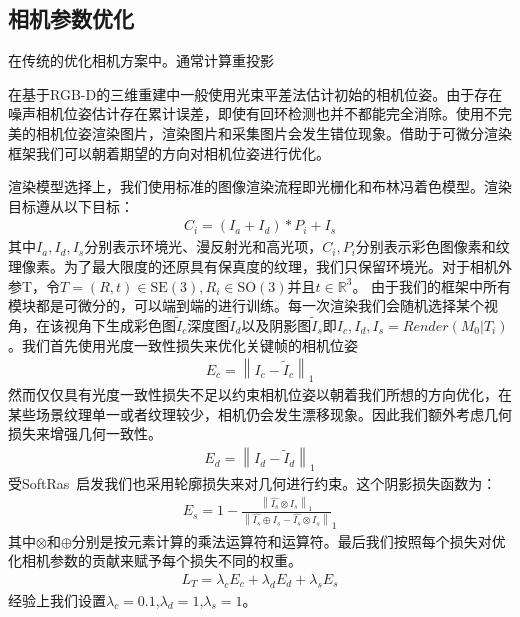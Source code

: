 \subsection{相机参数优化}
在传统的优化相机方案中。通常计算重投影

在基于RGB-D的三维重建中一般使用光束平差法估计初始的相机位姿。由于存在噪声相机位姿估计存在累计误差，即使有回环检测也并不都能完全消除。使用不完美的相机位姿渲染图片，渲染图片和采集图片会发生错位现象。借助于可微分渲染框架我们可以朝着期望的方向对相机位姿进行优化。\par
渲染模型选择上，我们使用标准的图像渲染流程即光栅化和布林冯着色模型。渲染目标遵从以下目标：
\begin{align}
	C_i = (I_a + I_d) * P_i + I_s
\end{align}
其中$I_a,I_d,I_s$分别表示环境光、漫反射光和高光项，$C_i,P_i$分别表示彩色图像素和纹理像素。为了最大限度的还原具有保真度的纹理，我们只保留环境光。对于相机外参T，令$T = (R,t)\in \mathrm{SE} (3),R_i \in \mathrm{SO}(3)$并且$t\in\mathbb{R}^3$。 
由于我们的框架中所有模块都是可微分的，可以端到端的进行训练。每一次渲染我们会随机选择某个视角，在该视角下生成彩色图$\tilde{I}_c$深度图$\tilde{I}_d$以及阴影图$\tilde{I}_s$即$I_c,I_d,I_s = Render(M_0|T_i)$。我们首先使用光度一致性损失来优化关键帧的相机位姿
\begin{align}
	E_c = \left \| I_c - \tilde{I}_c  \right \|_1 
\end{align}
然而仅仅具有光度一致性损失不足以约束相机位姿以朝着我们所想的方向优化，在某些场景纹理单一或者纹理较少，相机仍会发生漂移现象。因此我们额外考虑几何损失来增强几何一致性。
\begin{align}
	E_d = \left \| I_d - \tilde{I}_d  \right \|_1 
\end{align}
受SoftRas~\cite{ShichenLiu2019SoftRA}启发我们也采用轮廓损失来对几何进行约束。这个阴影损失函数为：
\begin{align}
	E_s = 1 - \frac{\left \| \hat{I_s}\otimes I_s  \right \|_1 }{\left \| \hat{I_s}\oplus  I_s- \hat{I_s}\otimes I_s \right \| }_1  
\end{align}
其中$\otimes $和$\oplus $分别是按元素计算的乘法运算符和运算符。最后我们按照每个损失对优化相机参数的贡献来赋予每个损失不同的权重。
\begin{align}
	L_T = \lambda_c E_c + \lambda_d E_d +\lambda_s E_s
\end{align}经验上我们设置$\lambda_c = 0.1$,$\lambda_d = 1$,$\lambda_s = 1$。

